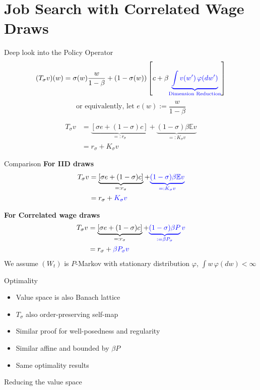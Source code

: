 \section{Job Search with Correlated Wage Draws}
\begin{frame}{Deep look into the Policy Operator}
        $$
(T_\sigma v)(w) = \sigma(w) \frac{w}{1-\beta} + (1-\sigma(w))\left[c+\beta\textcolor{blue}{\underbrace{\int v(w')\, \varphi(dw')}_{\text{Dimension Reduction}}}\right]
$$
$$
\text{or equivalently, let $e(w):=\frac{w}{1-\beta}$}
$$

\begin{align*}
    T_\sigma v &= \underbrace{[\sigma e+(1-\sigma)c]}_{=:r_\sigma} + \underbrace{(1-\sigma)\beta \mathbb{E}v}_{=:K_\sigma v}\\
    &= r_\sigma + K_\sigma v
\end{align*}
\end{frame}

\begin{frame}{Comparison}
\textbf{For IID draws}
\begin{align*}
    T_\sigma v &= \underbrace{[\sigma e+(1-\sigma)c]}_{=:r_\sigma} + \textcolor{blue}{\underbrace{(1-\sigma)\beta \mathbb{E}v}_{=:K_\sigma v}}\\
    &= r_\sigma + \textcolor{blue}{K_\sigma v}
\end{align*}

\textbf{For Correlated wage draws}
\begin{align*}
    T_\sigma v &= \underbrace{[\sigma e+(1-\sigma)c]}_{=:r_\sigma} + \textcolor{blue}{\underbrace{(1-\sigma)\beta P}_{:=\beta P_\sigma}v}\\
    &= r_\sigma +\textcolor{blue}{\beta P_\sigma v}
\end{align*}
We assume $(W_t)$ is $P$-Markov with stationary distribution $\varphi$, $\int w\,\varphi(dw)<\infty$
\end{frame}

\begin{frame}{Optimality}
\begin{itemize}
    \item Value space is also Banach lattice
    \item $T_\sigma$ also order-preserving self-map
    \item Similar proof for well-posedness and regularity
    \item Similar affine and bounded by $\beta P$
    \item Same optimality results
\end{itemize}
    
\end{frame}

\begin{frame}{Reducing the value space}
    
\end{frame}